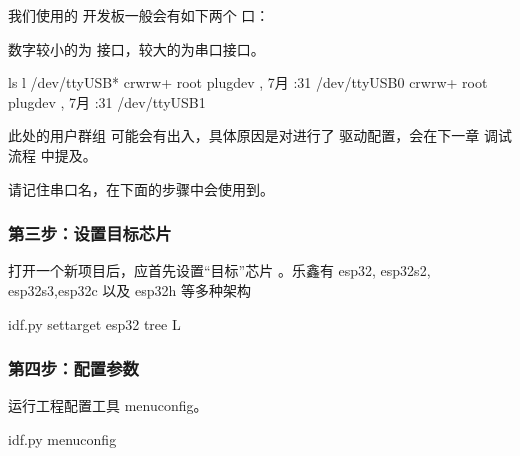\documentclass[a4paper,12pt,english]{sphinxmanual}
\begin{document}
\sphinxAtStartPar
我们使用的 开发板一般会有如下两个  口：

\sphinxAtStartPar
数字较小的为 接口，较大的为串口接口。

\begin{sphinxVerbatim}[commandchars=\\\{\}]
ls \PYGZhy{}l /dev/ttyUSB*
crw\PYGZhy{}rw\PYGZhy{}\PYGZhy{}\PYGZhy{}\PYGZhy{}+  root plugdev ,  7月   :31 /dev/ttyUSB0
crw\PYGZhy{}rw\PYGZhy{}\PYGZhy{}\PYGZhy{}\PYGZhy{}+  root plugdev ,  7月   :31 /dev/ttyUSB1
\end{sphinxVerbatim}

\sphinxAtStartPar
此处的用户群组 可能会有出入，具体原因是对进行了 驱动配置，会在下一章 调试流程 中提及。

\sphinxAtStartPar
请记住串口名，在下面的步骤中会使用到。


\subsubsection{第三步：设置目标芯片}
\label{\detokenize{exp-esp32/ide/esp-idf-cli:id7}}
\sphinxAtStartPar
打开一个新项目后，应首先设置“目标”芯片 。乐鑫有 esp32, esp32\sphinxhyphen{}s2, esp32\sphinxhyphen{}s3,esp32\sphinxhyphen{}c 以及 esp32\sphinxhyphen{}h 等多种架构

\begin{sphinxVerbatim}[commandchars=\\\{\}]
idf.py set\PYGZhy{}target esp32
tree \PYGZhy{}L 
\end{sphinxVerbatim}


\subsubsection{第四步：配置参数}
\label{\detokenize{exp-esp32/ide/esp-idf-cli:id8}}
\sphinxAtStartPar
运行工程配置工具 menuconfig。

\begin{sphinxVerbatim}[commandchars=\\\{\}]
idf.py menuconfig
\end{sphinxVerbatim}
\end{document}

